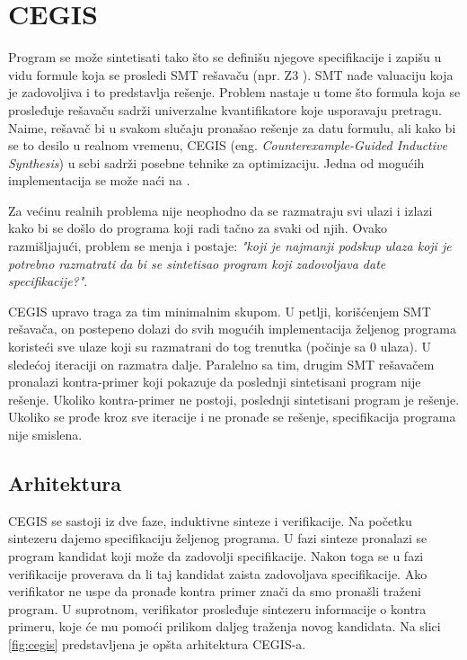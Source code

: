 \section{CEGIS}
\label{sec:cegis}

Program se može sintetisati tako što se definišu njegove specifikacije i zapišu u vidu formule koja se prosledi SMT rešavaču (npr. Z3 \cite{Z3}). SMT nađe valuaciju koja je zadovoljiva i to predstavlja rešenje. Problem nastaje u tome što formula koja se prosleđuje rešavaču sadrži univerzalne kvantifikatore koje usporavaju pretragu. Naime, rešavač bi u svakom slučaju pronašao rešenje za datu formulu, ali kako bi se to desilo u realnom vremenu, CEGIS (eng. \emph{Counterexample-Guided Inductive Synthesis}) u sebi sadrži posebne tehnike za optimizaciju. Jedna od mogućih implementacija se može naći na \cite{CEGISimpl}.

Za većinu realnih problema nije neophodno da se razmatraju svi ulazi i izlazi kako bi se došlo do programa koji radi tačno za svaki od njih. Ovako razmišljajući, problem se menja i postaje: \emph{"koji je najmanji podskup ulaza koji je potrebno razmatrati da bi se sintetisao program koji zadovoljava date specifikacije?"}.

CEGIS upravo traga za tim minimalnim skupom. U petlji, korišćenjem SMT rešavača, on postepeno dolazi do svih mogućih implementacija že\-lje\-nog programa koristeći sve ulaze koji su razmatrani do tog trenutka (počinje sa 0 ulaza). U sledećoj iteraciji on razmatra dalje. Paralelno sa tim, drugim SMT rešavačem pronalazi kontra-primer koji pokazuje da poslednji sintetisani program nije rešenje. Ukoliko kontra-primer ne postoji, poslednji sintetisani program je rešenje. Ukoliko se prođe kroz sve iteracije i ne pronađe se rešenje, specifikacija programa nije smislena.


\subsection{Arhitektura}
\label{subsec:Arhitektura}

CEGIS se sastoji iz dve faze, induktivne sinteze i verifikacije. Na početku sintezeru dajemo specifikaciju željenog programa. U fazi sinteze pronalazi se program kandidat koji može da zadovolji specifikacije. Nakon toga se u fazi verifikacije proverava da li taj kandidat zaista zadovoljava specifikacije. Ako verifikator ne uspe da pronađe kontra primer znači da smo pronašli traženi program. U suprotnom, verifikator prosleđuje sintezeru informacije o kontra primeru, koje će mu pomoći prilikom daljeg traženja novog kandidata. Na slici \ref{fig:cegis} predstavljena je opšta arhitektura CEGIS-a.

